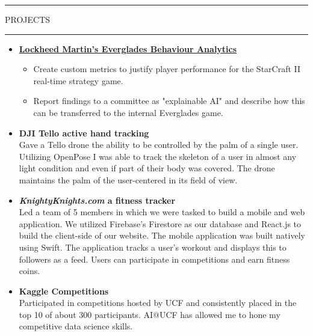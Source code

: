 \documentclass{article}
\newcommand{\makesection}[1]{\hrule\vskip1mm\uppercase{#1}\vskip1mm\hrule}
\begin{document}
\makesection{Projects}
\begin{itemize}[leftmargin=.35cm]
    \item \textbf{\href{https://github.com/ucfcs/Fall2020-Group-20}{Lockheed Martin's Everglades Behaviour Analytics}}
    \vspace*{-1.5mm}
    \raggedright
    \begin{itemize}[leftmargin=.35cm]
        \item Create custom metrics to justify player performance for the StarCraft II real-time strategy game.
        \item Report findings to a committee as "explainable AI" and describe how this can be transferred to the internal Everglades game.
    \end{itemize}

    \item \textbf{DJI Tello active hand tracking} \\
    Gave a Tello drone the ability to be controlled by the palm of a single user. Utilizing OpenPose I was able to track the skeleton of a user in almost any light condition and even if part of their body was covered. The drone maintains the palm of the user-centered in its field of view.

    \item \textbf{\textit{KnightyKnights.com} a fitness tracker} \\
    Led a team of 5 members in which we were tasked to build a mobile and web application. We utilized Firebase's Firestore as our database and React.js to build the client-side of our website. The mobile application was built natively using Swift. The application tracks a user's workout and displays this to followers as a feed. Users can participate in competitions and earn fitness coins.

    \item \textbf{Kaggle Competitions} \\
    Participated in competitions hosted by UCF and consistently placed in the top 10 of about 300 participants. AI@UCF has allowed me to hone my competitive data science skills.
\end{itemize}
\end{document}
